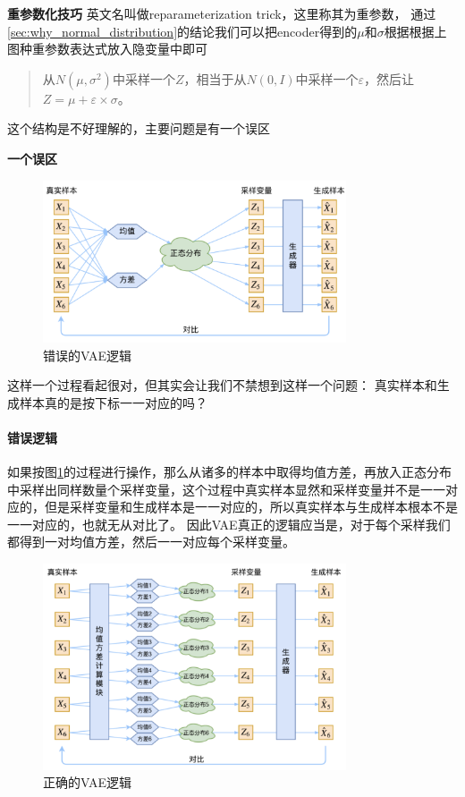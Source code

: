\textbf{重参数化技巧}\newline
\label{sec:reparameterization}
英文名叫做reparameterization trick，这里称其为重参数，
通过\ref{sec:why_normal_distribution}的结论我们可以把encoder得到的$\mu$和$\sigma$根据根据上图种重参数表达式放入隐变量中即可
\begin{quotation}
    从$N(\mu, \sigma^2)$中采样一个$Z$，相当于从$N(0, I)$中采样一个$\varepsilon$，然后让$Z=\mu+\varepsilon\times\sigma$。
\end{quotation}
这个结构是不好理解的，主要问题是有一个误区

\textbf{一个误区} \newline
\begin{figure}[htbp]
    \centering
    \includegraphics[width=0.8\textwidth]{figures/chapter2/vaeno.png}
    \caption{错误的VAE逻辑}
    \label{fig:vae_mistake}
\end{figure}
这样一个过程看起很对，但其实会让我们不禁想到这样一个问题： \newline
真实样本和生成样本真的是按下标一一对应的吗？\newline
\paragraph{错误逻辑}
如果按图\ref{fig:vae_mistake}的过程进行操作，那么从诸多的样本中取得均值方差，再放入正态分布中采样出同样数量个采样变量，这个过程中真实样本显然和采样变量并不是一一对应的，但是采样变量和生成样本是一一对应的，所以真实样本与生成样本根本不是一一对应的，也就无从对比了。
因此VAE真正的逻辑应当是，对于每个采样我们都得到一对均值方差，然后一一对应每个采样变量。
\begin{figure}[htbp]
    \centering
    \includegraphics[width=0.8\textwidth]{figures/chapter2/vaeyes.png}
    \caption{正确的VAE逻辑}
    \label{fig:vae_correct}
\end{figure}
